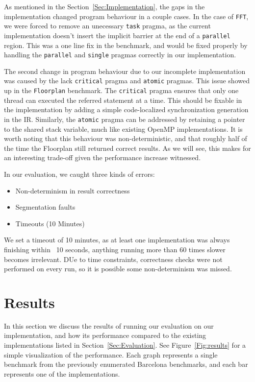 \documentclass[sigconf]{acmart}
\begin{document}
As mentioned in the Section~\ref{Sec:Implementation}, the gaps in the implementation
changed program behaviour in a couple cases. In the case of \texttt{FFT}, we were
forced to remove an unecessary \texttt{task} pragma, as the current implementation
doesn't insert the implicit barrier at the end of a \texttt{parallel} region. This 
was a one line fix in the benchmark, and would be fixed properly by handling
the \texttt{parallel} and \texttt{single} pragmas correctly in our implementation. 

The second change in program behaviour due to our incomplete implementation was
caused by the lack \texttt{critical} pragma and \texttt{atomic} pragmas. This
issue showed up in the \texttt{Floorplan} benchmark. The \texttt{critical} pragma
ensures that only one thread can executed the referred statement at a time. 
This should be fixable in the implementation by adding a simple code-localized
synchronization generation in the IR. Similarly, the \texttt{atomic} pragma 
can be addressed by retaining a pointer to the shared stack variable, much like
existing OpenMP implementations. It is worth noting that this behaviour was
non-deterministic, and that roughly half of the time the Floorplan still
returned correct results. As we will see, this makes for an interesting
trade-off given the performance increase witnessed.

In our evaluation, we caught three kinds of errors:

\begin{itemize}
\item Non-determinism in result correctness
\item Segmentation faults
\item Timeouts (10 Minutes)
\end{itemize}

We set a timeout of 10 minutes, as at least one implementation was always
finishing within ~10 seconds, anything running more than 60 times slower
becomes irrelevant. DUe to time constraints, correctness checks were not
performed on every run, so it is possible some non-determinism was missed. 

\section{Results} \label{Sec:Results}

In this section we discuss the results of running our evaluation on our
implementation, and how its performance compared to the existing
implementations listed in Section~\ref{Sec:Evaluation}. See
Figure~\ref{Fig:results} for a simple visualization of the performance. Each
graph represents a single benchmark from the previously enumerated Barcelona
benchmarks, and each bar represents one of the implementations. 
\end{document}
